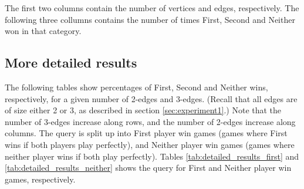 The first two columns contain the number of vertices and edges, respectively. The following three collumns contains the number of times First, Second and Neither won in that category.

\subsection{More detailed results}
\label{sec:more_detailed_results}

The following tables show percentages of First, Second and Neither wins, respectively, for a given number of 2-edges and 3-edges.
(Recall that all edges are of size either 2 or 3, as described in section \ref{sec:experiment1}.)
Note that the number of 3-edges increase along rows, and the number of 2-edges increase along columns.
The query is split up into First player win games (games where First wins if both players play perfectly), and Neither player win games (games where neither player wins if both play perfectly).
Tables \ref{tab:detailed_results_first} and \ref{tab:detailed_results_neither} shows the query for First and Neither player win games, respectively.

\restoregeometry

